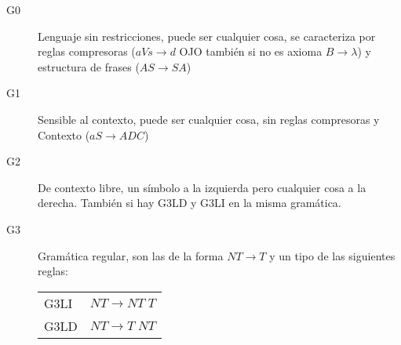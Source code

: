 \documentclass[12pt, twoside, openright]{report} %
\begin{document}
\begin{description}
	\item[G0] Lenguaje sin restricciones, puede ser cualquier cosa, se caracteriza por reglas compresoras ($aVs \rightarrow d$ OJO también si no es axioma $B \rightarrow \lambda$) y estructura de frases ($AS \rightarrow SA$)
	\item[G1] Sensible al contexto, puede ser cualquier cosa, sin reglas compresoras y Contexto ($aS \rightarrow ADC$)
	\item[G2] De contexto libre, un símbolo a la izquierda pero cualquier cosa a la derecha. También si hay G3LD y G3LI en la misma gramática.
	\item[G3] Gramática regular, son las de la forma $NT \rightarrow T$ y un tipo de las siguientes reglas:
	      \begin{table}[H]
		      \centering\begin{tabular}{ll}
			      G3LI & $NT \rightarrow NT \; T$ \\
			      G3LD & $NT \rightarrow T \; NT$
		      \end{tabular}
	      \end{table}
\end{description}
\end{document}
